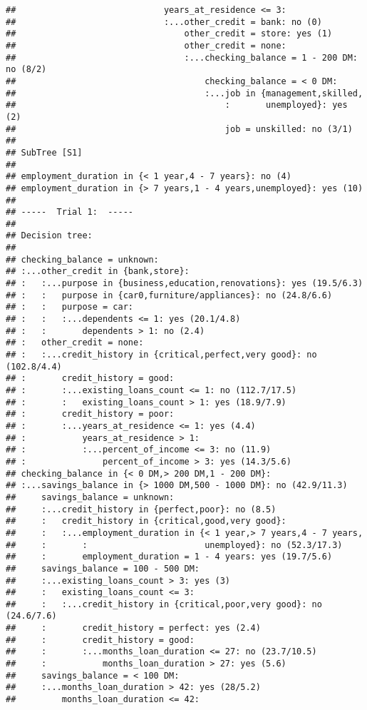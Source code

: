 \documentclass[
]{article}
\begin{document}
\begin{verbatim}
##                             years_at_residence <= 3:
##                             :...other_credit = bank: no (0)
##                                 other_credit = store: yes (1)
##                                 other_credit = none:
##                                 :...checking_balance = 1 - 200 DM: no (8/2)
##                                     checking_balance = < 0 DM:
##                                     :...job in {management,skilled,
##                                         :       unemployed}: yes (2)
##                                         job = unskilled: no (3/1)
## 
## SubTree [S1]
## 
## employment_duration in {< 1 year,4 - 7 years}: no (4)
## employment_duration in {> 7 years,1 - 4 years,unemployed}: yes (10)
## 
## -----  Trial 1:  -----
## 
## Decision tree:
## 
## checking_balance = unknown:
## :...other_credit in {bank,store}:
## :   :...purpose in {business,education,renovations}: yes (19.5/6.3)
## :   :   purpose in {car0,furniture/appliances}: no (24.8/6.6)
## :   :   purpose = car:
## :   :   :...dependents <= 1: yes (20.1/4.8)
## :   :       dependents > 1: no (2.4)
## :   other_credit = none:
## :   :...credit_history in {critical,perfect,very good}: no (102.8/4.4)
## :       credit_history = good:
## :       :...existing_loans_count <= 1: no (112.7/17.5)
## :       :   existing_loans_count > 1: yes (18.9/7.9)
## :       credit_history = poor:
## :       :...years_at_residence <= 1: yes (4.4)
## :           years_at_residence > 1:
## :           :...percent_of_income <= 3: no (11.9)
## :               percent_of_income > 3: yes (14.3/5.6)
## checking_balance in {< 0 DM,> 200 DM,1 - 200 DM}:
## :...savings_balance in {> 1000 DM,500 - 1000 DM}: no (42.9/11.3)
##     savings_balance = unknown:
##     :...credit_history in {perfect,poor}: no (8.5)
##     :   credit_history in {critical,good,very good}:
##     :   :...employment_duration in {< 1 year,> 7 years,4 - 7 years,
##     :       :                       unemployed}: no (52.3/17.3)
##     :       employment_duration = 1 - 4 years: yes (19.7/5.6)
##     savings_balance = 100 - 500 DM:
##     :...existing_loans_count > 3: yes (3)
##     :   existing_loans_count <= 3:
##     :   :...credit_history in {critical,poor,very good}: no (24.6/7.6)
##     :       credit_history = perfect: yes (2.4)
##     :       credit_history = good:
##     :       :...months_loan_duration <= 27: no (23.7/10.5)
##     :           months_loan_duration > 27: yes (5.6)
##     savings_balance = < 100 DM:
##     :...months_loan_duration > 42: yes (28/5.2)
##         months_loan_duration <= 42:

\end{verbatim}
\end{document}
